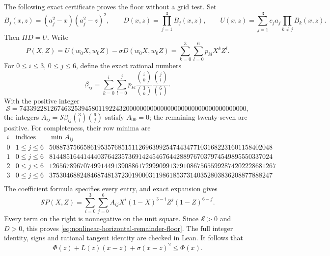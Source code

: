 The following exact certificate proves the floor without a grid test.
Set
\[
 B_j(x,z)=(a_j^2-x)(a_j^2-z)^2,\qquad
 D(x,z)=\prod_{j=1}^3B_j(x,z),\qquad
 U(x,z)=\sum_{j=1}^3c_ja_j\!\prod_{k\ne j}B_k(x,z).
\]
Then \(HD=U\).  Write
\[
 P(X,Z)=U(w_0X,w_0Z)-\sigma D(w_0X,w_0Z)
       =\sum_{k=0}^{3}\sum_{l=0}^{6}p_{kl}X^kZ^l.
\]
For \(0\le i\le3\), \(0\le j\le6\), define the exact rational numbers
\[
 \beta_{ij}=\sum_{k=0}^{i}\sum_{l=0}^{j}p_{kl}
       \frac{\binom{i}{k}}{\binom{3}{k}}
       \frac{\binom{j}{l}}{\binom{6}{l}}.
\]
With the positive integer
\[
 \mathcal S=743392281267463253945801192243200000000000000000000000000000000000,
\]
the integers \(A_{ij}=\mathcal S\beta_{ij}\binom{3}{i}\binom{6}{j}\)
satisfy \(A_{00}=0\); the remaining twenty-seven are positive.
For completeness, their row minima are
\[
 \begin{array}{c|c|r}
 i&\text{indices included}&\min A_{ij}\\\hline
0 & 1\le j\le6 & 50887375665861953576851511269639925474434771031682231601158402048 \\
1 & 0\le j\le6 & 81448516441444037642357369142454676442889767037974549895550337024 \\
2 & 0\le j\le6 & 126567896707499144913908861729990991379108675655992874202228681267 \\
3 & 0\le j\le6 & 37530468824846874813723019000311986185373140352803836208877888247 \\
 \end{array}
\]
The coefficient formula specifies every entry, and exact expansion gives
\begin{equation}
 \mathcal SP(X,Z)=
 \sum_{i=0}^{3}\sum_{j=0}^{6}A_{ij}
 X^i(1-X)^{3-i}Z^j(1-Z)^{6-j}.
 \label{eq:nonlinear-horizontal-bernstein}
\end{equation}
Every term on the right is nonnegative on the unit square.  Since
\(\mathcal S>0\) and \(D>0\), this proves
\eqref{eq:nonlinear-horizontal-remainder-floor}.  The full integer
identity, signs and rational tangent identity are checked in Lean.
It follows that
\begin{equation}
 \Phi(z)+L(z)(x-z)+\sigma(x-z)^2\le\Phi(x).
 \label{eq:nonlinear-horizontal-strong-tangent}
\end{equation}

